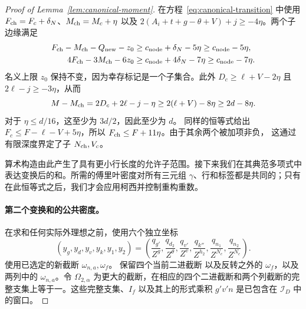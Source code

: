 \documentclass[11pt,a4paper]{article}
\numberwithin{equation}{section}
\numberwithin{figure}{section}
\theoremstyle{definition}
\theoremstyle{remark}
\begin{document}
\begin{proof}[Proof of Lemma~\ref{lem:canonical-moment}]
在方程~\eqref{eq:canonical-transition} 中使用 \(F_{\rm ch}=F_c+\delta_N\)、\(M_{\rm ch}=M_c+\eta\) 以及
\(2(A_i+t+g-\theta+V)+j\ge-4\eta\)。两个子边缘满足
\begin{equation}\label{eq:inverse-child-margins}
 \begin{aligned}
 F_{\rm ch}-M_{\rm ch}-Q_{\rm new}-z_0
   &\ge c_{\rm node}+\delta_N-5\eta\ge c_{\rm node}-5\eta,\\
 4F_{\rm ch}-3M_{\rm ch}-6z_0
   &\ge c_{\rm node}+4\delta_N-7\eta\ge c_{\rm node}-7\eta.
 \end{aligned}
\end{equation}
名义上限 \(z_0\) 保持不变，因为幸存标记是一个子集合。此外 \(D_c\ge\ell+V-2\eta\) 且
\(2\ell-j\ge-3\eta\)，从而
\begin{equation}\label{eq:inverse-row-decrease}
 M-M_{\rm ch}=2D_c+2\ell-j-\eta
       \ge2(\ell+V)-8\eta\ge2d-8\eta.
\end{equation}
对于 \(\eta\le d/16\)，这至少为 \(3d/2\)，因此至少为 \(d\)。
同样的恒等式给出 \(F_c\le F-\ell-V+5\eta\)，所以
\(F_{\rm ch}\le F+11\eta\)。由于其余两个被加项非负，
这通过有限深度界定了子 \(N_{\rm ch},V_c\)。

算术构造由此产生了具有更小行长度的允许子范围。接下来我们在其典范多项式中表达变换后的和。所需的傅里叶密度对所有三元组 \(\gamma\)、行和标签都是共同的；只有在此恒等式之后，我们才会应用柯西并控制重构重数。

\paragraph{第二个变换和的公共密度。}
在求和任何实际外理想之前，使用六个独立坐标
\[
 (y_g,y_d,y_v,y_k,y_1,y_2)
 =\left(\frac{q_{g'}}{Z^g},\frac{q_{d_2}}{Z^\theta},
 \frac{q_{v'}}{Z^v},\frac{q_{k''}}{Z^{h_2}},
 \frac{q_{n_1}}{Z^{N_c}},\frac{q_{n_2}}{Z^{N_c}}\right).
\]
使用已选定的新截断 \(\omega_{n,a},\omega_f\)。
保留四个当前二进截断
以及反转之外的 \(\omega_f\)，以及两列中的 \(\omega_{n,a}\)。令 \(\Omega_{2,\alpha}\) 为更大的截断，在相应的四个二进截断和两个列截断的完整支集上等于一。这些完整支集、\(I_f\) 以及其上的形式乘积
\(g'v'n\) 是已包含在 \(\mathcal I_D\) 中的窗口。


\end{proof}
\end{document}

